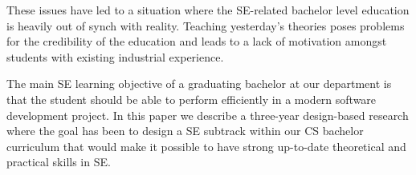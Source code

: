 \documentclass{sig-alternate}
\begin{document}
These issues have led to a situation where the SE-related bachelor level education is heavily out of synch with reality. Teaching yesterday's theories poses problems for the credibility of the education and leads to a lack of motivation amongst students with existing industrial experience.

The main SE learning objective of a graduating bachelor at our department is that the student should be able to perform efficiently in a modern software development project. In this paper we describe a three-year design-based research where the goal has been to design a SE subtrack within our CS bachelor curriculum that would make it possible to have strong up-to-date theoretical and practical skills in SE.



\nocite{*}
\end{document}
